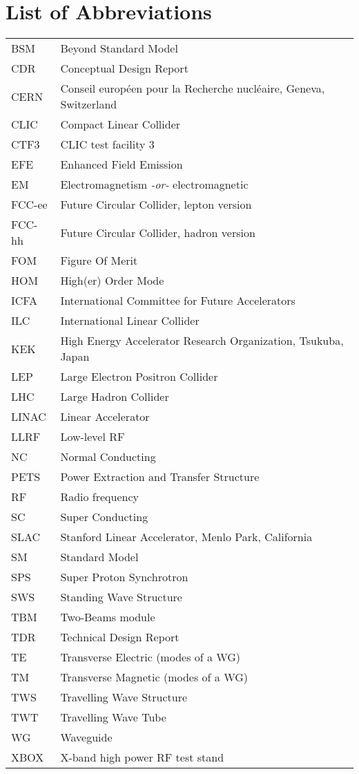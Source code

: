\chapter*{List of Abbreviations}

\begin{tabular}{l l}
BSM		&	Beyond Standard Model\\
CDR		&	Conceptual Design Report\\
CERN	&	Conseil europ\'een pour la Recherche nucl\'eaire, Geneva, Switzerland\\
CLIC		&	Compact Linear Collider\\
CTF3	&	CLIC test facility 3\\
EFE		&	Enhanced Field Emission\\
EM		&	Electromagnetism \textit{-or-} electromagnetic\\
FCC-ee	&	Future Circular Collider, lepton version\\
FCC-hh	&	Future Circular Collider, hadron version\\
FOM		&	Figure Of Merit\\
HOM		&	High(er) Order Mode\\
ICFA		&	International Committee for Future Accelerators\\
ILC		&	International Linear Collider\\
KEK		&	High Energy Accelerator Research Organization, Tsukuba, Japan      \\  
LEP		&	Large Electron Positron Collider\\
LHC		&	Large Hadron Collider \\
LINAC	&	Linear Accelerator\\
LLRF	&	Low-level RF\\
NC		&	Normal Conducting\\
PETS	&	Power Extraction and Transfer Structure\\
RF		&	Radio frequency\\
SC		&	Super Conducting\\
SLAC	&	Stanford Linear Accelerator, Menlo Park, California\\
SM		&	Standard Model\\
SPS		&	Super Proton Synchrotron\\
SWS		&	Standing Wave Structure\\
TBM		&	Two-Beams module\\
TDR		&	Technical Design Report\\
TE		&	Transverse Electric (modes of a WG)\\
TM		&	Transverse Magnetic (modes of a WG)\\
TWS		&	Travelling Wave Structure\\
TWT		&	Travelling Wave Tube\\
WG		&	Waveguide\\
XBOX	&	X-band high power RF test stand\\
\end{tabular}